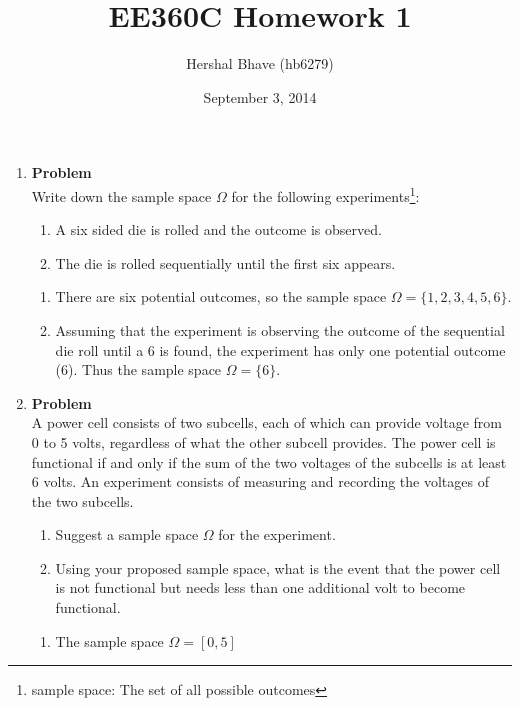 \documentclass[12pt]{article}
\title{EE360C Homework 1}
\author{Hershal Bhave (hb6279)}
\date{September 3, 2014}
\newenvironment{Ex}{\textbf{Problem}\vspace{.75em}\\}{}
\begin{document}
\maketitle
\begin{enumerate}
\item
  \begin{Ex}
    Write down the sample space $\Omega$ for the following
    experiments\footnote{sample space: The set of all possible
      outcomes}:
    \begin{enumerate}
    \item A six sided die is rolled and the outcome is observed.
    \item The die is rolled sequentially until the first six appears.
    \end{enumerate}
    \begin{solution} \hfill
      \begin{enumerate}
      \item There are six potential outcomes, so the sample space
        $\Omega = \{1,2,3,4,5,6\}$.
      \item Assuming that the experiment is observing the outcome of
        the sequential die roll until a 6 is found, the experiment has
        only one potential outcome (6). Thus the sample space $\Omega
        = \{6\}$.
      \end{enumerate}
    \end{solution}
  \end{Ex}
\item
  \begin{Ex}
    A power cell consists of two subcells, each of which can provide
    voltage from 0 to 5 volts, regardless of what the other subcell
    provides. The power cell is functional if and only if the sum of
    the two voltages of the subcells is at least 6 volts. An
    experiment consists of measuring and recording the voltages of the
    two subcells.
    \begin{enumerate}
    \item Suggest a sample space $\Omega$ for the experiment.
    \item Using your proposed sample space, what is the event that the
      power cell is not functional but needs less than one additional
      volt to become functional.
    \end{enumerate}
    \begin{solution} \hfill
      \begin{enumerate}
      \item The sample space $\Omega = [0,5]$

\end{enumerate}
\end{solution}
\end{Ex}
\end{enumerate}
\end{document}
